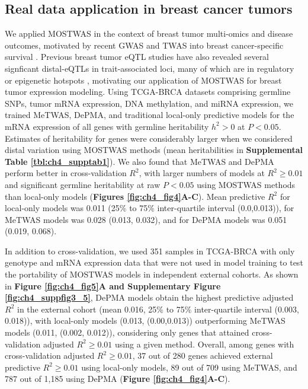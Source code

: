 \subsection{Real data application in breast cancer tumors}

We applied MOSTWAS in the context
of breast tumor multi-omics and
disease outcomes, motivated by recent
GWAS and TWAS into breast cancer-specific survival \cite{Khan2018,Michailidou2013,Michailidou2015,Guo2015,Bhattacharya2020APopulations}. 
Previous breast tumor eQTL studies have
also revealed several signficant
distal-eQTLs in trait-associated
loci, many of which are in regulatory
or epigenetic hotspots
\cite{Bhattacharya2020APopulations,Quiroz-Zarate2017ExpressionTissue},
motivating our application of MOSTWAS
for breast tumor expression modeling.
Using TCGA-BRCA datasets comprising germline SNPs,
tumor mRNA expression, DNA methylation, and miRNA
expression, we trained MeTWAS,
DePMA, and traditional local-only predictive models 
for the mRNA expression of all genes
with germline heritability $h^2 > 0$
at $P < 0.05$.
Estimates of heritability
for genes were considerably larger
when we considered distal variation
using MOSTWAS methods 
(mean heritabilities in \textbf{Supplemental
Table \ref{tbl:ch4_supptab1}}).
We also found that MeTWAS and DePMA
perform better in cross-validation
$R^2$,
with larger numbers of 
models at $R^2 \geq 0.01$
and significant germline heritability
at raw $P < 0.05$
using MOSTWAS methods than
local-only models (\textbf{Figures 
\ref{fig:ch4_fig4}A-C}).
Mean predictive $R^2$
for local-only models was
0.011 (25\% to 75\% inter-quartile
interval (0.0,0.013)), for
MeTWAS models was
0.028 (0.013, 0.032),
and for DePMA models was
0.051 (0.019, 0.068).

In addition to cross-validation,
we used 351 samples in TCGA-BRCA
with only genotype and mRNA expression data
that were not used in model training to
test the portability
of MOSTWAS models in independent
external cohorts. As shown in
\textbf{Figure \ref{fig:ch4_fig5}A and
Supplementary Figure \ref{fig:ch4_suppfig3_5}},
DePMA models obtain the highest
predictive adjusted $R^2$ in
the external cohort (mean 0.016, 25\% to 75\% inter-quartile
interval (0.003, 0.018)), 
with local-only
models (0.013, (0.00,0.013))
outperforming MeTWAS models (0.011,
(0.002, 0.012)),
considering only genes that attained
cross-validation adjusted $R^2 \geq 0.01$
using a given method. Overall,
among genes with cross-validation
adjusted $R^2 \geq 0.01$, 37 out of 280 genes achieved
external predictive $R^2 \geq 0.01$
using local-only models, 89 out of 709 using
MeTWAS, and 787 out of 1,185 using DePMA
(\textbf{Figure \ref{fig:ch4_fig4}A-C}).


